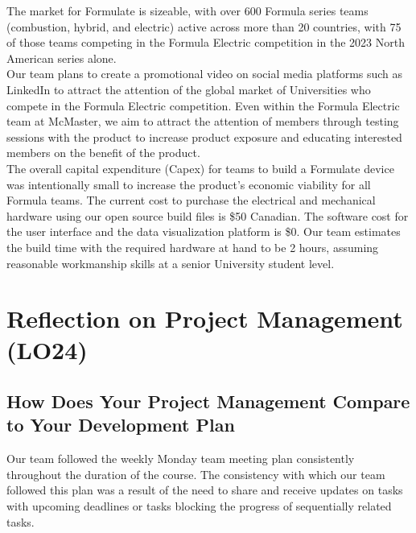 \documentclass[12pt]{article}
\begin{document}
The market for Formulate is sizeable, with over 600 Formula series teams (combustion, hybrid, and electric) active across more than 20 countries, with 75 of those teams competing in the Formula Electric competition in the 2023 North American series alone. \\

Our team plans to create a promotional video on social media platforms such as LinkedIn to attract the attention of the global market of Universities who compete in the Formula Electric competition. Even within the Formula Electric team at McMaster, we aim to attract the attention of members through testing sessions with the product to increase product exposure and educating interested members on the benefit of the product. \\

The overall capital expenditure (Capex) for teams to build a Formulate device was intentionally small to increase the product's economic viability for all Formula teams. The current cost to purchase the electrical and mechanical hardware using our open source build files is \$50 Canadian. The software cost for the user interface and the data visualization platform is \$0. Our team estimates the build time with the required hardware at hand to be 2 hours, assuming reasonable workmanship skills at a senior University student level. \\



\section{Reflection on Project Management (LO24)}


\subsection{How Does Your Project Management Compare to Your Development Plan}


Our team followed the weekly Monday team meeting plan consistently throughout the duration of the course. The consistency with which our team followed this plan was a result of the need to share and receive updates on tasks with upcoming deadlines or tasks blocking the progress of sequentially related tasks. \\
\end{document}
